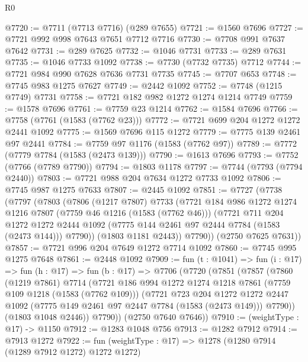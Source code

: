 \begin{lexlean}{R0}
\begin{coremodule}
@7720 := @7711 (@7713 @7716) (@289 @7655)
@7721 := @1560 @7696
@7727 := @7721 @992 @998 @7643 @7651 @7712 @7716
@7730 := @7708 @991 @7637 @7642
@7731 := @289 @7625
@7732 := @1046 @7731
@7733 := @289 @7631
@7735 := @1046 @7733 @1092
@7738 := @7730 (@7732 @7735) @7712
@7744 := @7721 @984 @990 @7628 @7636 @7731 @7735
@7745 := @7707 @653
@7748 := @7745 @983 @1275 @7627
@7749 := @2442 @1092
@7752 := @7748 (@1215 @7749) @7731
@7758 := @7721 @182 @982 @1272 @1274 @1214 @7749
@7759 := @1578 @7696
@7761 := @7759 @23 @1214
@7762 := @1584 @7696
@7766 := @7758 (@7761 (@1583 (@7762 @23)))
@7772 := @7721 @699 @204 @1272 @1272 @2441 @1092
@7775 := @1569 @7696 @115 @1272
@7779 := @7775 @139 @2461 @97 @2441
@7784 := @7759 @97 @1176 (@1583 (@7762 @97))
@7789 := @7772 (@7779 @7784 (@1583 (@2473 @139)))
@7790 := @1613 @7696
@7793 := @7752 (@7766 (@7789 @7790))
@7794 := @1803 @1178
@7797 := @7744 (@7793 (@7794 @2440))
@7803 := @7721 @988 @204 @7634 @1272 @7733 @1092
@7806 := @7745 @987 @1275 @7633
@7807 := @2445 @1092
@7851 := @7727
    (@7738
      (@7797
        (@7803
          (@7806
            (@1217 @7807)
            @7733
            (@7721
              @184
              @986
              @1272
              @1274
              @1216
              @7807
              (@7759 @46 @1216 (@1583 (@7762 @46)))
              (@7721
                @711
                @204
                @1272
                @1272
                @2444
                @1092
                (@7775 @144 @2461 @97 @2444 @7784 (@1583 (@2473 @144)))
                @7790))
            (@1803 @1181 @2443))
          @7790))
      (@2750 @7625 @7631))
@7857 := @7721 @996 @204 @7649 @1272 @7714 @1092
@7860 := @7745 @995 @1275 @7648
@7861 := @2448 @1092
@7909 := fun (t : @1041) =>
  fun (i : @17) =>
  fun (h : @17) =>
  fun (b : @17) =>
  @7706
    (@7720
      (@7851
        (@7857
          (@7860
            (@1219 @7861)
            @7714
            (@7721
              @186
              @994
              @1272
              @1274
              @1218
              @7861
              (@7759 @109 @1218 (@1583 (@7762 @109)))
              (@7721
                @723
                @204
                @1272
                @1272
                @2447
                @1092
                (@7775 @149 @2461 @97 @2447 @7784 (@1583 (@2473 @149)))
                @7790))
            (@1803 @1048 @2446))
          @7790))
      (@2750 @7640 @7646))
@7910 := (weightType : @17) -> @1150
@7912 := @1283 @1048 @756
@7913 := @1282 @7912
@7914 := @7913 @1272
@7922 := fun (weightType : @17) => @1278 (@1280 @7914 (@1289 @7912 @1272) @1272 @1272)

\end{coremodule}
\end{lexlean}
